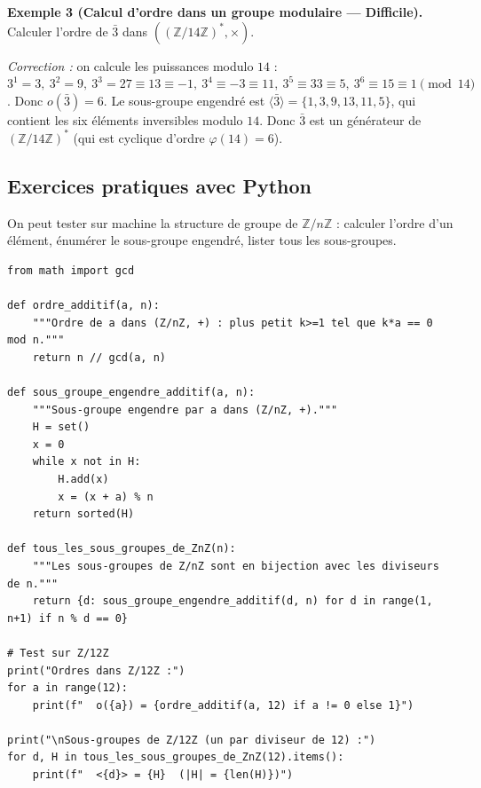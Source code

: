 \documentclass[12pt,a4paper]{report}
\theoremstyle{definition}
\theoremstyle{remark}
\begin{document}
\medskip

\textbf{Exemple 3 (Calcul d'ordre dans un groupe modulaire --- Difficile).}
Calculer l'ordre de $\bar{3}$ dans $((\mathbb{Z}/14\mathbb{Z})^*, \times)$.

\textit{Correction :} on calcule les puissances modulo $14$ :
$3^1 = 3,\ 3^2 = 9,\ 3^3 = 27 \equiv 13 \equiv -1,\ 3^4 \equiv -3 \equiv 11,\ 3^5 \equiv 33 \equiv 5,\ 3^6 \equiv 15 \equiv 1 \pmod{14}$.
Donc $o(\bar{3}) = 6$. Le sous-groupe engendré est $\langle \bar{3} \rangle = \{1, 3, 9, 13, 11, 5\}$, qui contient les six éléments inversibles modulo $14$. Donc $\bar{3}$ est un générateur de $(\mathbb{Z}/14\mathbb{Z})^*$ (qui est cyclique d'ordre $\varphi(14) = 6$).

\subsection{Exercices pratiques avec Python}
On peut tester sur machine la structure de groupe de $\mathbb{Z}/n\mathbb{Z}$ : calculer l'ordre d'un élément, énumérer le sous-groupe engendré, lister tous les sous-groupes.

\begin{lstlisting}
from math import gcd

def ordre_additif(a, n):
    """Ordre de a dans (Z/nZ, +) : plus petit k>=1 tel que k*a == 0 mod n."""
    return n // gcd(a, n)

def sous_groupe_engendre_additif(a, n):
    """Sous-groupe engendre par a dans (Z/nZ, +)."""
    H = set()
    x = 0
    while x not in H:
        H.add(x)
        x = (x + a) % n
    return sorted(H)

def tous_les_sous_groupes_de_ZnZ(n):
    """Les sous-groupes de Z/nZ sont en bijection avec les diviseurs de n."""
    return {d: sous_groupe_engendre_additif(d, n) for d in range(1, n+1) if n % d == 0}

# Test sur Z/12Z
print("Ordres dans Z/12Z :")
for a in range(12):
    print(f"  o({a}) = {ordre_additif(a, 12) if a != 0 else 1}")

print("\nSous-groupes de Z/12Z (un par diviseur de 12) :")
for d, H in tous_les_sous_groupes_de_ZnZ(12).items():
    print(f"  <{d}> = {H}  (|H| = {len(H)})")
\end{lstlisting}
\end{document}
